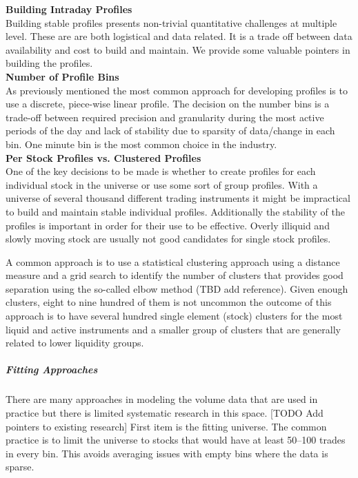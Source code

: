 \noindent\textbf{Building Intraday Profiles} \\

Building stable profiles presents non-trivial quantitative challenges at multiple level. These are are both logistical and data related. It is a trade off between data availability and cost to build and maintain. We provide some valuable pointers in building the profiles. \\

\noindent\textbf{Number of Profile Bins} \\

As previously mentioned the most common approach for developing profiles is to use a discrete, piece-wise linear profile. The decision on the number bins is a trade-off between required precision and granularity during the most active periods of the day and lack of stability due to sparsity of data/change in each bin. One minute bin is the most common choice in the industry. \\

\noindent\textbf{Per Stock Profiles vs. Clustered Profiles} \\

One of the key decisions to be made is whether to create profiles for each individual stock in the universe or use some sort of group profiles. With a universe of several thousand different trading instruments it might be impractical to build and maintain stable individual profiles. Additionally the stability of the profiles is important in order for their use to be effective. Overly illiquid and slowly moving stock are usually not good candidates for single stock profiles. 

A common approach is to use a statistical clustering approach using a distance measure and a grid search to identify the number of clusters that provides good separation using the so-called elbow method (TBD add reference). Given enough clusters, eight to nine hundred of them is not uncommon the outcome of this approach is to have several hundred single element (stock) clusters for the most liquid and active instruments and a smaller group of clusters that are generally related to lower liquidity groups.


\subparagraph{Fitting Approaches}

There are many approaches in modeling the volume data that are used in practice but there is limited systematic research in this space. [TODO Add pointers to existing research] First item is the fitting universe. The common practice is to limit the universe to stocks that would have at least 50--100 trades in every bin. This avoids averaging issues with empty bins where the data is sparse.



